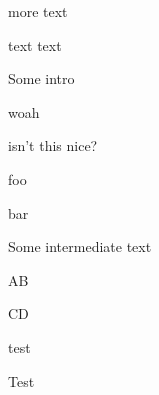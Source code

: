 \documentclass{article}
\begin{document}
\begin{itemize}
\begin{item}
\begin{itemize}
\begin{item}
\begin{enumerate}
\begin{item}
\begin{itemize}
\begin{item}
              \end{item}
              \begin{item} more text
              \end{item}
            \end{itemize}
          \end{item}
          \begin{item}
            text text
          \end{item}
        \end{enumerate}
        \begin{item}
          Some intro
          \begin{itemize}       %
           \begin{item} woah
           \end{item}
           \begin{item} isn't this nice?
           \end{item}
          \end{itemize}
        \end{item}
      \end{item}
    \end{itemize}
    \begin{itemize}         %
      \begin{item} foo
      \end{item}
      \begin{item} bar \sample
      \end{item}
    \end{itemize}
    Some intermediate text
    \begin{itemize}         %
      \begin{item} AB
      \end{item}
      \begin{item} CD
      \end{item}
    \end{itemize}
  \end{item}
  \begin{item} test
  \end{item}
\end{itemize}

Test   %
\end{document}
